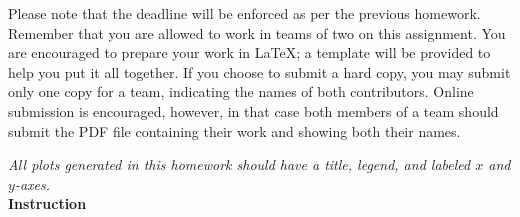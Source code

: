 %
%
%
Please note that the deadline will be enforced as per the previous homework. Remember that you are allowed to work in teams of two on this assignment. You are encouraged to prepare your work in \LaTeX{}; a template will be provided to help you put it all together. If you choose  to submit a hard copy, you may submit only one copy for a team, indicating the names of both contributors. Online submission is encouraged, however, in that case both members of a team should submit the PDF file containing  their work and showing both their names.

\emph{All plots generated in this homework should have a title, legend, and labeled $x$ and $y$-axes.} \\[15pt]

\textbf{Instruction}

